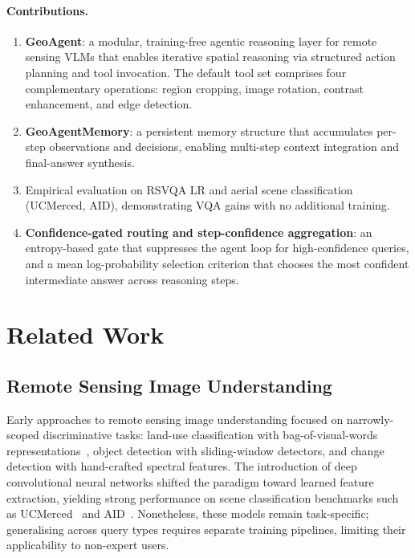 \documentclass{article}
\begin{document}
\paragraph{Contributions.}
\begin{enumerate}
  \item \textbf{GeoAgent}: a modular, training-free agentic reasoning layer for
    remote sensing VLMs that enables iterative spatial reasoning via structured
    action planning and tool invocation.  The default tool set comprises four
    complementary operations: region cropping, image rotation, contrast
    enhancement, and edge detection.
  \item \textbf{GeoAgentMemory}: a persistent memory structure that accumulates
    per-step observations and decisions, enabling multi-step context integration
    and final-answer synthesis.
  \item Empirical evaluation on RSVQA LR and aerial scene classification
    (UCMerced, AID), demonstrating VQA gains with no additional
    training.
  \item \textbf{Confidence-gated routing and step-confidence aggregation}:
    an entropy-based gate that suppresses the agent loop for high-confidence
    queries, and a mean log-probability selection criterion that chooses the
    most confident intermediate answer across reasoning steps.
\end{enumerate}

\section{Related Work}
\label{sec:related}

\subsection{Remote Sensing Image Understanding}

Early approaches to remote sensing image understanding focused on narrowly-scoped
discriminative tasks: land-use classification with bag-of-visual-words
representations~\citep{yang2010ucmerced}, object detection with sliding-window
detectors, and change detection with hand-crafted spectral features.  The
introduction of deep convolutional neural networks shifted the paradigm toward
learned feature extraction, yielding strong performance on scene classification
benchmarks such as UCMerced~\citep{yang2010ucmerced} and AID~\citep{xia2017aid}.
Nonetheless, these models remain task-specific; generalising across query types
requires separate training pipelines, limiting their applicability to non-expert
users.
\end{document}
